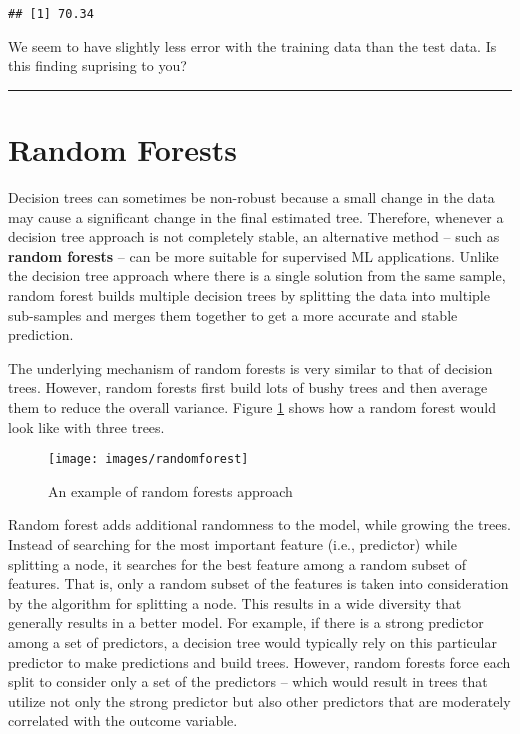 \documentclass[
]{book}
\begin{document}
\begin{verbatim}
## [1] 70.34
\end{verbatim}

We seem to have slightly less error with the training data than the test data. Is this finding suprising to you?

\begin{center}\rule{0.5\linewidth}{0.5pt}\end{center}

\hypertarget{random-forests}{%
\section{Random Forests}\label{random-forests}}

Decision trees can sometimes be non-robust because a small change in the data may cause a significant change in the final estimated tree. Therefore, whenever a decision tree approach is not completely stable, an alternative method -- such as \textbf{random forests} -- can be more suitable for supervised ML applications. Unlike the decision tree approach where there is a single solution from the same sample, random forest builds multiple decision trees by splitting the data into multiple sub-samples and merges them together to get a more accurate and stable prediction.

The underlying mechanism of random forests is very similar to that of decision trees. However, random forests first build lots of bushy trees and then average them to reduce the overall variance. Figure \ref{fig:fig6-2} shows how a random forest would look like with three trees.

\begin{figure}
\texttt{[image: images/randomforest]} \caption{An example of random forests approach}\label{fig:fig6-2}
\end{figure}

Random forest adds additional randomness to the model, while growing the trees. Instead of searching for the most important feature (i.e., predictor) while splitting a node, it searches for the best feature among a random subset of features. That is, only a random subset of the features is taken into consideration by the algorithm for splitting a node. This results in a wide diversity that generally results in a better model. For example, if there is a strong predictor among a set of predictors, a decision tree would typically rely on this particular predictor to make predictions and build trees. However, random forests force each split to consider only a set of the predictors -- which would result in trees that utilize not only the strong predictor but also other predictors that are moderately correlated with the outcome variable.
\end{document}
